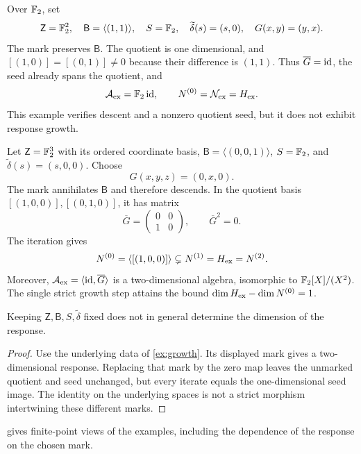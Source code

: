 \documentclass[11pt,a4paper]{article}
\begin{document}
\begin{example}\label{ex:identity}
Over $\mathbb F_2$, set
\[
 \mathsf Z=\mathbb F_2^2,\quad\mathsf B=\langle(1,1)\rangle,\quad
 S=\mathbb F_2,\quad\widetilde\delta(s)=(s,0),\quad G(x,y)=(y,x).
\]
The mark preserves $\mathsf B$.  The quotient is one dimensional, and
$[(1,0)]=[(0,1)]\ne0$ because their difference is $(1,1)$.
Thus $\overline G=\operatorname{id}$, the seed already spans the quotient, and
\[
 \mathcal A_{\mathrm{ex}}=\mathbb F_2\operatorname{id},\qquad N^{(0)}=\mathcal N_{\mathrm{ex}}=H_{\mathrm{ex}}.
\]
This example verifies descent and a nonzero quotient seed, but it does
not exhibit response growth.
\end{example}

\begin{example}
\label{ex:growth}
Let $\mathsf Z=\mathbb F_2^3$ with its ordered coordinate basis,
$\mathsf B=\langle(0,0,1)\rangle$, $S=\mathbb F_2$, and
$\widetilde\delta(s)=(s,0,0)$.  Choose
\[
 G(x,y,z)=(0,x,0).
\]
The mark annihilates $\mathsf B$ and therefore descends.  In the quotient
basis $[(1,0,0)],[(0,1,0)]$, it has matrix
\[
 \overline G=\begin{pmatrix}0&0\\1&0\end{pmatrix},\qquad
 \overline G^2=0.
\]
The iteration gives
\[
 N^{(0)}=\langle[(1,0,0)]\rangle
 \subsetneq N^{(1)}=H_{\mathrm{ex}}=N^{(2)}.
\]
Moreover, $\mathcal A_{\mathrm{ex}}=\langle\operatorname{id},\overline G\rangle$ is a two-dimensional
algebra, isomorphic to $\mathbb F_2[X]/(X^2)$.  The single strict growth step
attains the bound $\dim H_{\mathrm{ex}}-\dim N^{(0)}=1$.
\end{example}

\begin{proposition}
\label{prop:marks-needed}
Keeping $\mathsf Z,\mathsf B,S,\widetilde\delta$ fixed does not in
general determine the dimension of the response.
\end{proposition}

\begin{proof}
Use the underlying data of \cref{ex:growth}.  Its displayed mark gives
a two-dimensional response.  Replacing that mark by the zero map leaves
the unmarked quotient and seed unchanged, but every iterate equals the
one-dimensional seed image.  The identity on the underlying spaces is
not a strict morphism intertwining these different marks.
\end{proof}

 gives finite-point views of the examples,
including the dependence of the response on the chosen mark.

\end{document}

